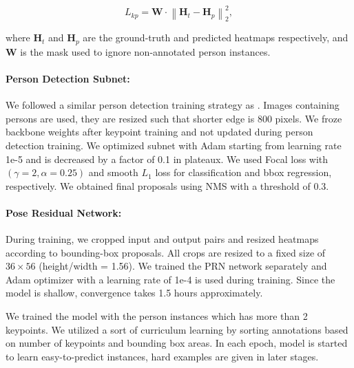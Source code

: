 \documentclass[runningheads]{llncs}
\newcommand{\norm}[1]{\left\lVert#1\right\rVert}
\begin{document}
\begin{equation}
L_{kp} = \mathbf{W} \cdot \norm{\mathbf{H}_t - \mathbf{H}_p}_{2}^{2},
\end{equation}




\noindent where $\mathbf{H}_t$ and $\mathbf{H}_p$ are the ground-truth and predicted heatmaps respectively, and $\mathbf{W}$ is the mask used to ignore non-annotated person instances. 
\paragraph{Person Detection Subnet:} 
We followed a similar person detection training strategy as \cite{Lin2017}. Images containing persons are used, they are resized such that shorter edge is 800 pixels. We froze backbone weights after keypoint training and not updated during person detection training. We optimized subnet with Adam \cite{Kingma} starting from learning rate 1e-5 and is decreased by a factor of 0.1 in plateaux. We used Focal loss with $(\gamma=2, \alpha=0.25)$ and smooth $L_1$ loss for classification and bbox regression, respectively. We obtained final proposals using NMS with a threshold of 0.3.
\paragraph{Pose Residual Network:}
During training, we cropped input and output pairs and resized heatmaps according to bounding-box proposals. All crops are resized to a fixed size of $36 \times 56$ (height/width = 1.56). We trained the PRN network separately and Adam optimizer \cite{Kingma} with a learning rate of 1e-4 is used during training. Since the model is shallow, convergence takes 1.5 hours approximately. 


We trained the model with the person instances which has more than 2 keypoints. We utilized a sort  of curriculum learning \cite{bengio2009} by sorting annotations based on number of keypoints and bounding box areas. In each epoch, model is started to learn easy-to-predict instances, hard examples are given in later stages. 
\end{document}
